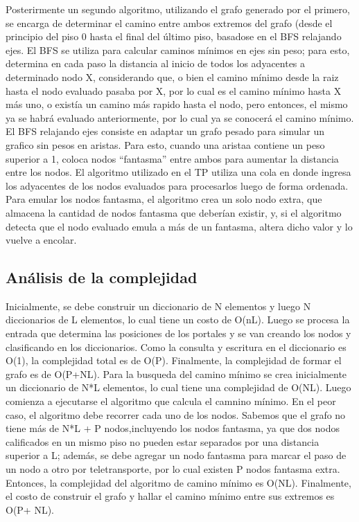 Posterirmente un segundo algoritmo, utilizando el grafo generado por el primero, se encarga de determinar el camino entre ambos extremos del grafo (desde el principio del piso 0 hasta el final del último piso, basadose en el BFS relajando ejes. El BFS se utiliza para calcular caminos mínimos en ejes sin peso; para esto, determina en cada paso la distancia al inicio de todos los adyacentes a determinado nodo X, considerando que, o bien el camino mínimo desde la raiz hasta el nodo evaluado pasaba por X, por lo cual es el camino mínimo hasta X más uno, o existía un camino más rapido hasta el nodo, pero entonces, el mismo ya se habrá evaluado anteriormente, por lo cual ya se conocerá el camino mínimo. El BFS relajando ejes consiste en adaptar un grafo pesado para simular un grafico sin pesos en aristas. Para esto, cuando una aristaa contiene un peso superior a 1, coloca nodos ``fantasma'' entre ambos para aumentar la distancia entre los nodos.
El algoritmo utilizado en el TP utiliza una cola en donde ingresa los adyacentes de los nodos evaluados para procesarlos luego de forma ordenada. Para emular los nodos fantasma, el algoritmo crea un solo nodo extra, que almacena la cantidad de nodos fantasma que deberían existir, y, si el algoritmo detecta que el nodo evaluado emula a más de un fantasma, altera dicho valor y lo vuelve a encolar.

\subsection{Análisis de la complejidad}
Inicialmente, se debe construir un diccionario de N elementos y luego N diccionarios de L elementos, lo cual tiene un costo de O(nL). Luego se procesa la entrada que determina las posiciones de los portales y se van creando los nodos y clasificando en los diccionarios. Como la consulta y escritura en el diccionario es O(1), la complejidad total es de O(P). Finalmente, la complejidad de formar el grafo es de O(P+NL).
Para la busqueda del camino mínimo se crea inicialmente un diccionario de N*L elementos, lo cual tiene una complejidad de O(NL). Luego comienza a ejecutarse el algoritmo que calcula el camnino mínimo. En el peor caso, el algoritmo debe recorrer cada uno de los nodos. Sabemos que el grafo no tiene más de N*L + P nodos,incluyendo los nodos fantasma, ya que dos nodos calificados en un mismo piso no pueden estar separados por una distancia superior a L; además, se debe agregar un nodo fantasma para marcar el paso de un nodo a otro por teletransporte, por lo cual existen P nodos fantasma extra. Entonces, la complejidad del algoritmo de camino mínimo es O(NL).
Finalmente, el costo de construir el grafo y hallar el camino mínimo entre sus extremos es O(P+ NL).


